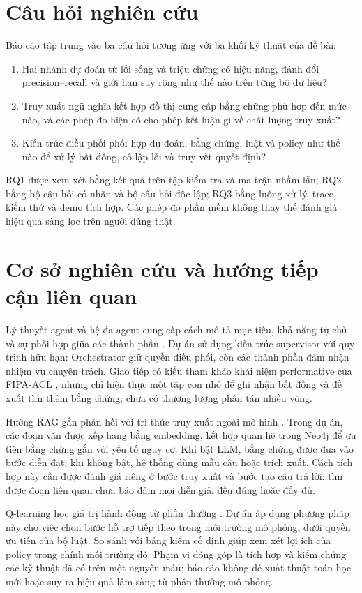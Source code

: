 \documentclass[12pt,a4paper]{report}
\begin{document}
\section{Câu hỏi nghiên cứu}
\label{sec:research-questions}
Báo cáo tập trung vào ba câu hỏi tương ứng với ba khối kỹ thuật của đề bài:
\begin{enumerate}[label=\textbf{RQ\arabic*.},leftmargin=1.7cm]
\item Hai nhánh dự đoán từ lối sống và triệu chứng có hiệu năng, đánh đổi precision--recall và giới hạn suy rộng như thế nào trên từng bộ dữ liệu?
\item Truy xuất ngữ nghĩa kết hợp đồ thị cung cấp bằng chứng phù hợp đến mức nào, và các phép đo hiện có cho phép kết luận gì về chất lượng truy xuất?
\item Kiến trúc điều phối phối hợp dự đoán, bằng chứng, luật và policy như thế nào để xử lý bất đồng, cô lập lỗi và truy vết quyết định?
\end{enumerate}
RQ1 được xem xét bằng kết quả trên tập kiểm tra và ma trận nhầm lẫn; RQ2 bằng bộ câu hỏi có nhãn và bộ câu hỏi độc lập; RQ3 bằng luồng xử lý, trace, kiểm thử và demo tích hợp. Các phép đo phần mềm không thay thế đánh giá hiệu quả sàng lọc trên người dùng thật.

\section{Cơ sở nghiên cứu và hướng tiếp cận liên quan}
Lý thuyết agent và hệ đa agent cung cấp cách mô tả mục tiêu, khả năng tự chủ và sự phối hợp giữa các thành phần \cite{wooldridge2009,jennings1998,russell2021}. Dự án sử dụng kiến trúc supervisor với quy trình hữu hạn: Orchestrator giữ quyền điều phối, còn các thành phần đảm nhận nhiệm vụ chuyên trách. Giao tiếp có kiểu tham khảo khái niệm performative của FIPA-ACL \cite{fipa2002}, nhưng chỉ hiện thực một tập con nhỏ để ghi nhận bất đồng và đề xuất tìm thêm bằng chứng; chưa có thương lượng phân tán nhiều vòng.

Hướng RAG gắn phản hồi với tri thức truy xuất ngoài mô hình \cite{lewis2020}. Trong dự án, các đoạn văn được xếp hạng bằng embedding, kết hợp quan hệ trong Neo4j để ưu tiên bằng chứng gắn với yếu tố nguy cơ. Khi bật LLM, bằng chứng được đưa vào bước diễn đạt; khi không bật, hệ thống dùng mẫu câu hoặc trích xuất. Cách tích hợp này cần được đánh giá riêng ở bước truy xuất và bước tạo câu trả lời: tìm được đoạn liên quan chưa bảo đảm mọi diễn giải đều đúng hoặc đầy đủ.

Q-learning học giá trị hành động từ phần thưởng \cite{watkins1992,sutton2018}. Dự án áp dụng phương pháp này cho việc chọn bước hỗ trợ tiếp theo trong môi trường mô phỏng, dưới quyền ưu tiên của bộ luật. So sánh với bảng kiểm cố định giúp xem xét lợi ích của policy trong chính môi trường đó. Phạm vi đóng góp là tích hợp và kiểm chứng các kỹ thuật đã có trên một nguyên mẫu; báo cáo không đề xuất thuật toán học mới hoặc suy ra hiệu quả lâm sàng từ phần thưởng mô phỏng.
\end{document}
